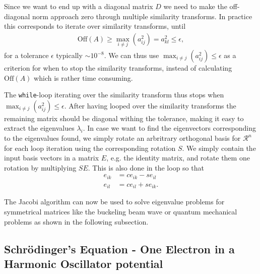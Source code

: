 \documentclass[twocolumn]{aastex62}
\begin{document}
Since we want to end up with a diagonal matrix $D$ we need to make the off-diagonal norm approach zero through multiple similarity transforms. In practice this corresponds to iterate over similarity transforms, until 
\begin{align}
\text{Off}(A) \geq \max_{i\neq j}(a_{ij}^2) = a_{kl}^2 \leq \epsilon,
\end{align}
for a tolerance $\epsilon$ typically $\sim 10^{-8}$. We can thus use 
$\max_{i\neq j}(a_{ij}^2)\leq \epsilon$ as a criterion for when to stop the similarity transforms, instead of calculating $\text{Off}(A)$ which is rather time consuming.

The \texttt{while}-loop iterating over the similarity transform thus stops when $\max_{i\neq j}(a_{ij}^2) \leq \epsilon$. After having looped over the similarity transforms the remaining matrix should be diagonal withing the tolerance, making it easy to extract the eigenvalues $\lambda_i$. In case we want to find the eigenvectors corresponding to the eigenvalues found, we simply rotate an arbritrary orthogonal basis for $\mathcal{R}^n$ for each loop iteration using the corresponding rotation $S$. We simply contain the input basis vectors in a matrix $E$, e.g. the identity matrix, and rotate them one rotation by multiplying $SE$. This is also done in the loop so that 
\begin{align}
	e_{ik} &= ce_{ik} - se_{il}\\
	e_{il} &= ce_{il} + se_{ik}.
\end{align}

The Jacobi algorithm can now be used to solve eigenvalue problems for symmetrical matrices like the buckeling beam wave or quantum mechanical problems as shown in the following subsection. 

\subsection{Schrödinger's Equation - One Electron in a Harmonic Oscillator potential}
\end{document}
